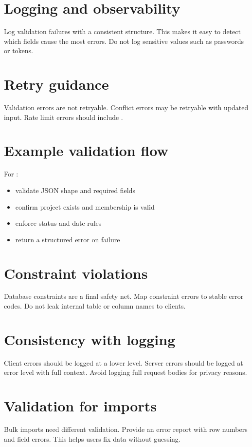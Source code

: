 \section{Logging and observability}
Log validation failures with a consistent structure.
This makes it easy to detect which fields cause the most errors.
Do not log sensitive values such as passwords or tokens.

\section{Retry guidance}
Validation errors are not retryable.
Conflict errors may be retryable with updated input.
Rate limit errors should include .

\section{Example validation flow}
For :
\begin{itemize}[nosep]
  \item validate JSON shape and required fields
  \item confirm project exists and membership is valid
  \item enforce status and date rules
  \item return a structured error on failure
\end{itemize}

\section{Constraint violations}
Database constraints are a final safety net.
Map constraint errors to stable error codes.
Do not leak internal table or column names to clients.

\section{Consistency with logging}
Client errors should be logged at a lower level.
Server errors should be logged at error level with full context.
Avoid logging full request bodies for privacy reasons.

\section{Validation for imports}
Bulk imports need different validation.
Provide an error report with row numbers and field errors.
This helps users fix data without guessing.

